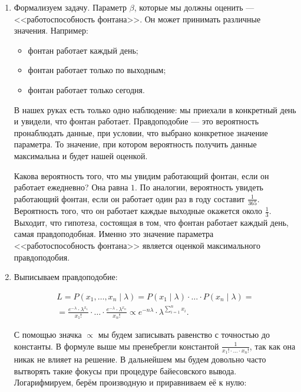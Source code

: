 \begin{sol}
	\begin{enumerate}	
	\item Формализуем задачу. Параметр $\beta$, которые мы должны оценить --- <<работоспособность фонтана>>. Он может принимать различные значения. Например:
	
	\begin{itemize}
		\item фонтан работает каждый день;
		\item фонтан работает только по выходным;
		\item фонтан работает только сегодня.
	\end{itemize}

	В нашех руках есть только одно наблюдение: мы приехали в конкретный день и увидели, что фонтан работает. Правдоподобие --- это вероятность пронаблюдать данные, при условии, что выбрано конкретное значение параметра. То значение, при котором вероятность получить данные максимальна и будет нашей оценкой. 
	
	 Какова вероятность того, что мы увидим работающий фонтан, если он работает ежедневно?  Она равна $1$. По аналогии, вероятность увидеть работающий фонтан, если он работает один раз в году составит $\frac{1}{365}$. Вероятность того, что он работает каждые выходные окажется около $\frac{1}{3}$.  Выходит, что гипотеза, состоящая в том, что фонтан работает каждый день, самая правдоподобная. Именно это значение параметра <<работоспособность фонтана>> является оценкой максимального правдоподобия. 
		
	\item Выписываем правдоподобие: 
	
	\begin{multline*}
	L = P(x_1, \ldots, x_n \mid \lambda) = P(x_1 \mid \lambda) \cdot \ldots \cdot P(x_n \mid \lambda) = \\ = \frac{e^{-\lambda} \cdot \lambda^{x_1}}{x_1!} \cdot \ldots \cdot \frac{e^{-\lambda} \cdot \lambda^{x_n}}{x_n!} \propto e^{-n \lambda} \cdot \lambda^{\sum_{i=1}^n x_i}.
	\end{multline*}
	
С помощью значка $\propto$ мы будем записывать равенство с точностью до константы. В формуле выше мы пренебрегли константой $\frac{1}{x_1! \cdot \ldots \cdot x_n!}$, так как она никак не влияет на решение. В дальнейшем мы будем довольно часто вытворять такие фокусы при процедуре байесовского вывода. Логарифмируем, берём производную и приравниваем её к нулю:
	

\end{enumerate}
\end{sol}
